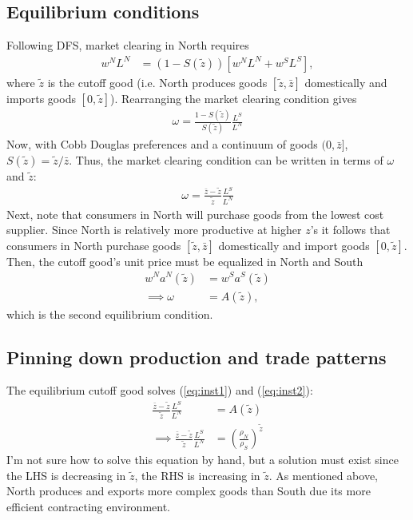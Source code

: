 \documentclass[12pt]{article}
\begin{document}
\subsection{Equilibrium conditions}
Following DFS, market clearing in North requires
\begin{align*}
w^N L^N &= (1-S(\tilde z))[w^NL^N + w^SL^S],
\end{align*}
where $\tilde z$ is the cutoff good (i.e. North produces goods $[\tilde z, \bar z]$ domestically and imports goods $[0,\tilde z]$). Rearranging the market clearing condition gives
\begin{align*}
\omega = \frac{1-S(\tilde z)}{S(\tilde z)} \frac{L^S}{L^N}
\end{align*}
Now, with Cobb Douglas preferences and a continuum of goods $(0, \bar z]$, $S(\tilde z) = \tilde z/\bar z$. Thus, the market clearing condition can be written in terms of $\omega$ and $\tilde z$:
\begin{align}
\omega = \frac{\bar z- \tilde z}{\tilde z} \frac{L^S}{L^N} \label{eq:inst1}
\end{align}
Next, note that consumers in North will purchase goods from the lowest cost supplier. Since North is relatively more productive at higher $z$'s it follows that consumers in North purchase goods $[\tilde z, \bar z]$ domestically and import goods $[0,\tilde z]$. Then, the cutoff good's unit price must be equalized in North and South
\begin{align}
w^N a^N(\tilde z) &= w^S a^S(\tilde z)  \nonumber \\
\implies \omega &= A(\tilde z) \label{eq:inst2},
\end{align}
which is the second equilibrium condition.

\subsection{Pinning down production and trade patterns}
The equilibrium cutoff good solves (\ref{eq:inst1}) and (\ref{eq:inst2}):
\begin{align*}
 \frac{\bar z- \tilde z}{\tilde z} \frac{L^S}{L^N}&= A(\tilde z)\\
 \implies  \frac{\bar z- \tilde z}{\tilde z} \frac{L^S}{L^N}&=\left(\frac{\rho_N}{\rho_S}\right)^{\tilde z}
\end{align*}
I'm not sure how to solve this equation by hand, but a solution must exist since the LHS is decreasing in $\tilde z$, the RHS is increasing in $\tilde z$. As mentioned above, North produces and exports more complex goods than South due its more efficient contracting environment.
\end{document}

